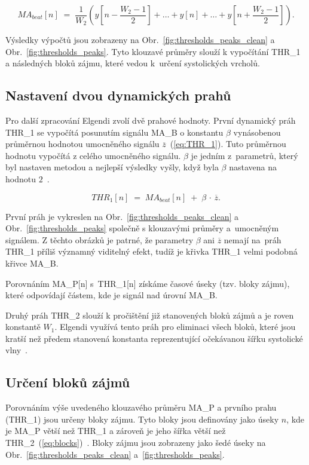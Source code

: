 \begin{equation}
	MA_{beat}[n] \;=\;
	\frac{1}{W_2}
	(y[n - \frac{W_2-1}{2}] + \ldots + y[n] + \ldots + y[n + \frac{W_2-1}{2}]).
	\label{eq:MA_B}
\end{equation}

Výsledky výpočtů jsou zobrazeny na Obr.~\ref{fig:thresholds_peaks_clean} a Obr.~\ref{fig:thresholds_peaks}.
Tyto klouzavé průměry slouží k vypočítání \acs{THR_1} a následných bloků zájmu, které vedou k~určení systolických vrcholů.

\subsection*{Nastavení dvou dynamických prahů}
\label{sec:thresholds}
% 
Pro další zpracování Elgendi zvolí dvě prahové hodnoty.
První dynamický práh \acs{THR_1} se vypočítá posunutím signálu \acs{MA_B} o konstantu \(\beta\) vynásobenou průměrnou hodnotou umocněného signálu \(\overline{z}\)~(\ref{eq:THR_1}).
Tuto průměrnou hodnotu vypočítá z celého umocněného signálu.
\(\beta\) je jedním z~parametrů, který byl nastaven metodou  a nejlepší výsledky vyšly, když byla $\beta$ nastavena na hodnotu $2$~\cite{Elgendi2013}.

\begin{equation}
	THR_1[n] \;=\; MA_{beat}[n] \;+\; \beta \,\cdot\, \overline{z}.
	\label{eq:THR_1}
\end{equation}

První práh je vykreslen na Obr.~\ref{fig:thresholds_peaks_clean} a Obr.~\ref{fig:thresholds_peaks} společně s klouzavými průměry a~umocněným signálem.
Z těchto obrázků je patrné, že parametry \(\beta\) ani \(\overline{z}\) nemají na~práh \acs{THR_1} příliš významný viditelný efekt, tudíž je křivka \acs{THR_1} velmi podobná křivce \acs{MA_B}.

Porovnáním \acs{MA_P}[n] s~\acs{THR_1}[n] získáme časové úseky (tzv. bloky zájmu), které odpovídají částem, kde je signál nad úrovní \acs{MA_B}.

Druhý práh \acs{THR_2} slouží k pročištění již stanovených bloků zájmů a je roven konstantě \(W_1\).
Elgendi využívá tento práh pro eliminaci všech bloků, které jsou kratší než předem stanovená konstanta reprezentující očekávanou šířku systolické vlny~\cite{Elgendi2013}.

\subsection*{Určení bloků zájmů}
\label{sec:blocks}
Porovnáním výše uvedeného klouzavého průměru \acs{MA_P} a prvního prahu (\acs{THR_1}) jsou určeny bloky zájmu.
Tyto bloky jsou definovány jako úseky $n$, kde je \acs{MA_P} větší než \acs{THR_1} a zároveň je jeho šířka větší než \acs{THR_2}~(\ref{eq:blocks})~\cite{Elgendi2013}.
Bloky zájmu jsou zobrazeny jako šedé úseky na Obr.~\ref{fig:thresholds_peaks_clean} a~\ref{fig:thresholds_peaks}.

